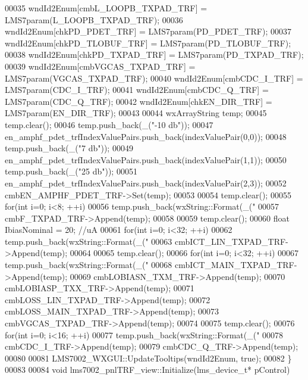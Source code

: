 \begin{DoxyCode}
00035     wndId2Enum[cmbL_LOOPB_TXPAD_TRF] = LMS7param(L_LOOPB_TXPAD_TRF);
00036     wndId2Enum[chkPD_PDET_TRF] = LMS7param(PD_PDET_TRF);
00037     wndId2Enum[chkPD_TLOBUF_TRF] = LMS7param(PD_TLOBUF_TRF);
00038     wndId2Enum[chkPD_TXPAD_TRF] = LMS7param(PD_TXPAD_TRF);
00039     wndId2Enum[cmbVGCAS_TXPAD_TRF] = LMS7param(VGCAS_TXPAD_TRF);
00040     wndId2Enum[cmbCDC_I_TRF] = LMS7param(CDC_I_TRF);
00041     wndId2Enum[cmbCDC_Q_TRF] = LMS7param(CDC_Q_TRF);
00042     wndId2Enum[chkEN_DIR_TRF] = LMS7param(EN_DIR_TRF);
00043 
00044     wxArrayString temp;
00045     temp.clear();
00046     temp.push\_back(\_(\textcolor{stringliteral}{"-10 db"}));
00047     en_amphf_pdet_trfIndexValuePairs.push\_back(indexValuePair(0,0));
00048     temp.push\_back(\_(\textcolor{stringliteral}{"7 db"}));
00049     en_amphf_pdet_trfIndexValuePairs.push\_back(indexValuePair(1,1));
00050     temp.push\_back(\_(\textcolor{stringliteral}{"25 db"}));
00051     en_amphf_pdet_trfIndexValuePairs.push\_back(indexValuePair(2,3));
00052     cmbEN_AMPHF_PDET_TRF->Set(temp);
00053 
00054     temp.clear();
00055     \textcolor{keywordflow}{for}(\textcolor{keywordtype}{int} i=0; i<8; ++i)
00056         temp.push\_back(wxString::Format(\_(\textcolor{stringliteral}{"%
00057     cmbF_TXPAD_TRF->Append(temp);
00058 
00059     temp.clear();
00060     \textcolor{keywordtype}{float} IbiasNominal = 20; \textcolor{comment}{//uA}
00061     \textcolor{keywordflow}{for}(\textcolor{keywordtype}{int} i=0; i<32; ++i)
00062         temp.push\_back(wxString::Format(\_(\textcolor{stringliteral}{"%
00063     cmbICT_LIN_TXPAD_TRF->Append(temp);
00064 
00065     temp.clear();
00066     \textcolor{keywordflow}{for}(\textcolor{keywordtype}{int} i=0; i<32; ++i)
00067         temp.push\_back(wxString::Format(\_(\textcolor{stringliteral}{"%
00068     cmbICT_MAIN_TXPAD_TRF->Append(temp);
00069     cmbLOBIASN_TXM_TRF->Append(temp);
00070     cmbLOBIASP_TXX_TRF->Append(temp);
00071     cmbLOSS_LIN_TXPAD_TRF->Append(temp);
00072     cmbLOSS_MAIN_TXPAD_TRF->Append(temp);
00073     cmbVGCAS_TXPAD_TRF->Append(temp);
00074 
00075     temp.clear();
00076     \textcolor{keywordflow}{for}(\textcolor{keywordtype}{int} i=0; i<16; ++i)
00077         temp.push\_back(wxString::Format(\_(\textcolor{stringliteral}{"%
00078     cmbCDC_I_TRF->Append(temp);
00079     cmbCDC_Q_TRF->Append(temp);
00080 
00081     LMS7002_WXGUI::UpdateTooltips(wndId2Enum, \textcolor{keyword}{true});
00082 \}
00083 
00084 \textcolor{keywordtype}{void} lms7002_pnlTRF_view::Initialize(lms_device_t* pControl)
}}}}
\end{DoxyCode}
